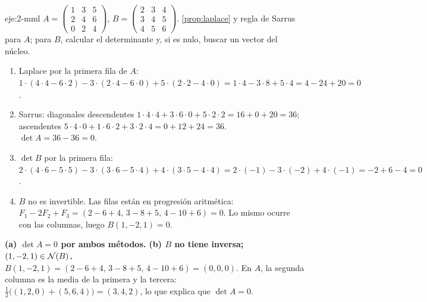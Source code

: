 \begin{solucion}{eje:2-mml}
\datos $A=\begin{pmatrix}1&3&5\\2&4&6\\0&2&4\end{pmatrix}$, $B=\begin{pmatrix}2&3&4\\3&4&5\\4&5&6\end{pmatrix}$.
\planteamiento \cref{prop:laplace} y regla de Sarrus para $A$; para $B$, calcular el determinante y, si es nulo, buscar un vector del núcleo.
\pasos
\begin{enumerate}[label=\arabic*.]
  \item Laplace por la primera fila de $A$: $1\cdot(4\cdot 4-6\cdot 2)-3\cdot(2\cdot 4-6\cdot 0)+5\cdot(2\cdot 2-4\cdot 0)=1\cdot 4-3\cdot 8+5\cdot 4=4-24+20=0$.
  \item Sarrus: diagonales descendentes $1\cdot 4\cdot 4+3\cdot 6\cdot 0+5\cdot 2\cdot 2=16+0+20=36$; ascendentes $5\cdot 4\cdot 0+1\cdot 6\cdot 2+3\cdot 2\cdot 4=0+12+24=36$. $\det A=36-36=0$.
  \item $\det B$ por la primera fila: $2\cdot(4\cdot 6-5\cdot 5)-3\cdot(3\cdot 6-5\cdot 4)+4\cdot(3\cdot 5-4\cdot 4)=2\cdot(-1)-3\cdot(-2)+4\cdot(-1)=-2+6-4=0$.
  \item $B$ no es invertible. Las filas están en progresión aritmética: $F_1-2F_2+F_3=(2-6+4,\,3-8+5,\,4-10+6)=0$. Lo mismo ocurre con las columnas, luego $B(1,-2,1)=0$.
\end{enumerate}
\resultado \textbf{(a) $\det A=0$ por ambos métodos. (b) $B$ no tiene inversa; $(1,-2,1)\in\mathcal{N}(B)$.}
\comprobacion $B(1,-2,1)=(2-6+4,\,3-8+5,\,4-10+6)=(0,0,0)$. En $A$, la segunda columna es la media de la primera y la tercera: $\tfrac12\bigl((1,2,0)+(5,6,4)\bigr)=(3,4,2)$, lo que explica que $\det A=0$.
\end{solucion}

